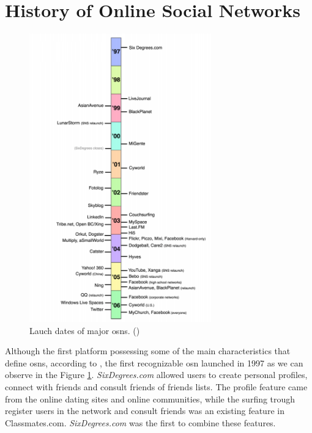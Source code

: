 \section{History of Online Social Networks}
\begin{figure}[h!]
\begin{center}
  \includegraphics[width=0.7\textwidth]{img/timeline.png}
\end{center}
\caption{\label{img:timeline} Lauch dates of major \glspl{osn}. (\cite{ellison2007social})}
\end{figure}

Although the first platform possessing some of the main characteristics that define \glspl{osn},
according to \cite{ellison2007social}, the first recognizable \gls{osn} launched in 1997 as we can observe in the Figure \ref{img:timeline}. \textit{SixDegrees.com} allowed users to create personal
profiles, connect with friends and consult friends of friends lists. The profile feature came from the
online dating sites and online communities, while the surfing trough register users in the network
and consult friends was an existing feature in Classmates.com. \textit{SixDegrees.com} was the first to combine
these features.

